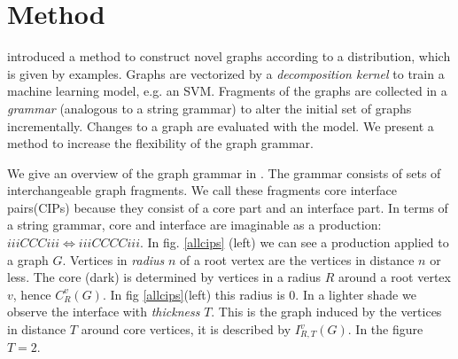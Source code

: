 \documentclass{article}
\begin{document}
\section{Method}

\cite{costa16} introduced a method
to construct novel graphs according to a distribution, which is given by
examples. Graphs are vectorized by a \emph{decomposition kernel}
to train a machine learning model, e.g. an SVM.
Fragments of the graphs are collected in 
a \emph{grammar} (analogous to a string grammar) to alter the initial
set of graphs incrementally. Changes to a graph are evaluated with the
model. 
We present a method to increase the flexibility of the graph grammar.

We give an overview of the graph grammar in \cite{costa16}.
The grammar consists of sets of interchangeable graph fragments.
We call these fragments core interface pairs(CIPs) because 
they consist of a core part and an interface part.
In terms of a string grammar, core and interface are imaginable 
as a production: $iiiCCCiii \Longleftrightarrow iiiCCCCiii$.
In fig. \ref{allcips} (left) we can see a production applied to a graph $G$.
Vertices in \emph{radius} $n$ of a root vertex are the vertices in distance $n$
or less. The core (dark) is determined by vertices in a radius $R$
around a root vertex $v$, hence $C_{R}^v(G)$. In fig \ref{allcips}(left)
this radius is $0$. In a lighter shade we observe the interface with 
\emph{thickness} $T$. This is the graph induced by the vertices in distance $T$
around core vertices, it is described by $I_{R,T}^v(G)$. In the figure $T=2$.
\end{document}
